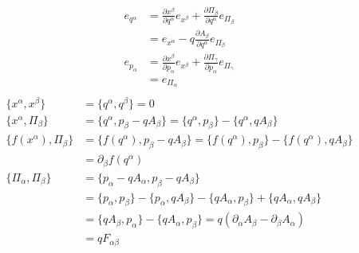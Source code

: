 \documentclass[11pt]{article}
\begin{document}
\begin{equation}
\begin{aligned}
e_{q^\alpha} &= \frac{\partial x^\beta }{\partial q^\alpha}e_{x^\beta} + \frac{\partial \Pi_\beta}{\partial q^\alpha}e_{\Pi_\beta} \\
&= e_{x^\alpha} - q \frac{\partial A_\beta}{\partial q^\alpha}e_{\Pi_\beta} \\
e_{p_\alpha} &= \frac{\partial x^\beta}{\partial p_\alpha}e_{x^\beta} + \frac{\partial \Pi_\gamma}{\partial p_\alpha}e_{\Pi_\gamma} \\
&= e_{\Pi_\alpha} \\
\end{aligned}
\end{equation}
\begin{equation}
\begin{aligned}
\{x^\alpha, x^\beta\} &= \{q^\alpha, q^\beta\} = 0 \\
\{x^\alpha, \Pi_\beta\} &= \{q^\alpha, p_\beta - q A_\beta\} = \{q^\alpha, p_\beta\} - \{q^\alpha, q A_\beta\} \\
\{f(x^\alpha), \Pi_\beta\} &= \{f(q^\alpha), p_\beta - q A_\beta\} = \{f(q^\alpha), p_\beta\} - \{f(q^\alpha), q A_\beta\} \\
&= \partial_\beta f(q^\alpha) \\
\{ \Pi_\alpha, \Pi_\beta\} &= \{p_\alpha - q A_\alpha, p_\beta - q A_\beta\} \\
&= \{p_\alpha, p_\beta\} - \{p_\alpha, q A_\beta\} - \{q A_\alpha, p_\beta\} + \{q A_\alpha , q A_\beta\} \\
&= \{q A_\beta, p_\alpha\} - \{q A_\alpha, p_\beta\} = q (\partial_\alpha A_\beta - \partial_\beta A_\alpha) \\
&= q F_{\alpha \beta} \\
\end{aligned}
\end{equation}
\end{document}
